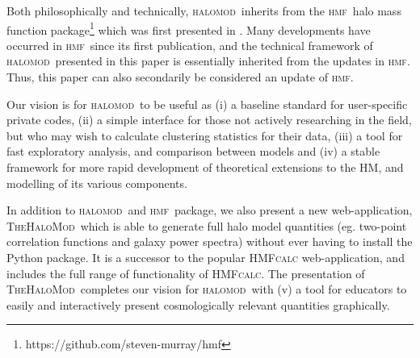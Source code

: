 \documentclass[5p]{elsarticle}
\newcommand{\halomod}{\textsc{halomod}}
\newcommand{\thm}{\textsc{TheHaloMod}}
\newcommand{\hmf}{\textsc{hmf}}
\newcommand{\bd}[1]{\textcolor{purple}{\textbf{[BD: #1]}}}
\begin{document}
Both philosophically and technically, \halomod\ inherits from the \hmf\ halo mass function package\footnote{https://github.com/steven-murray/hmf} which was first presented in \cite{Murray2013a}.
Many developments have occurred in \hmf\ since its first publication, and the technical framework of \halomod\ presented in this paper is essentially inherited from the updates in \hmf. 
Thus, this paper can also secondarily be considered an update of \hmf.

Our vision is for \halomod\  to be useful as 
(i) a baseline standard for user-specific private codes, 
(ii) a simple interface for those not actively researching in the field, but who may wish to calculate clustering statistics for their data, 
(iii) a tool for fast exploratory analysis, and comparison between models and 
(iv) a stable framework for more rapid development of theoretical extensions to the HM, and modelling of its various components. 



In addition to \halomod\ and \hmf\ package, we also present a new web-application, \thm\, which is able to generate full halo model quantities (eg. two-point correlation functions and galaxy power spectra) without ever having to install the Python package.
It is a successor to the popular \textsc{HMFcalc} \citep{Murray2013a} web-application, and includes the full range of functionality of \textsc{HMFcalc}.
The presentation of \thm\ completes our vision for \halomod\ with (v) a tool for educators to easily and interactively present cosmologically relevant quantities graphically.
\end{document}
